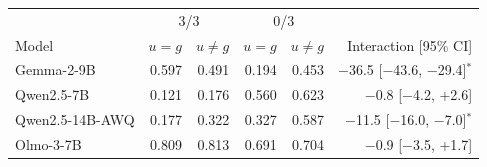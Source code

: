 \begin{tabular}{lrrrrr}
\toprule
& \multicolumn{2}{c}{3/3} & \multicolumn{2}{c}{0/3} & \\ Model & $u{=}g$ & $u{\neq}g$ & $u{=}g$ & $u{\neq}g$ & Interaction [95\% CI] \\
\midrule
Gemma-2-9B & 0.597 & 0.491 & 0.194 & 0.453 & $-$36.5 [$-$43.6, $-$29.4]$^{*}$ \\
Qwen2.5-7B & 0.121 & 0.176 & 0.560 & 0.623 & $-$0.8 [$-$4.2, +2.6] \\
Qwen2.5-14B-AWQ & 0.177 & 0.322 & 0.327 & 0.587 & $-$11.5 [$-$16.0, $-$7.0]$^{*}$ \\
Olmo-3-7B & 0.809 & 0.813 & 0.691 & 0.704 & $-$0.9 [$-$3.5, +1.7] \\
\bottomrule
\end{tabular}
